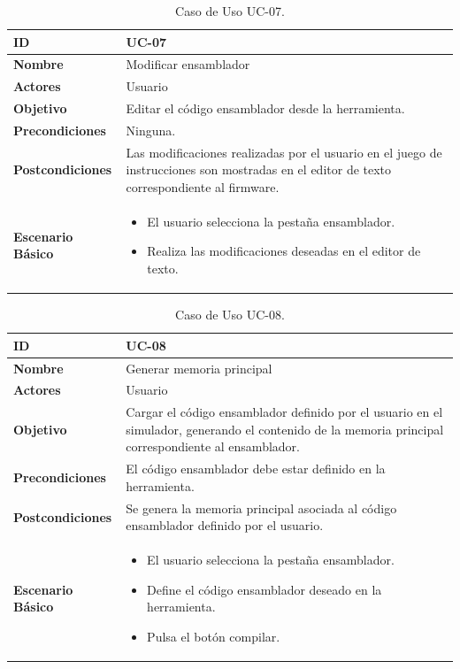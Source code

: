 \begin{center}
\begin{table}[htbp]
\centering
\begin{tabular}{@{}p{2.5cm} p{9cm}@{}} 
\toprule
\textbf{ID}	& UC-07  \\
\midrule
\textbf{Nombre} 		& Modificar ensamblador   \\
\midrule
\textbf{Actores} 		&	Usuario  \\
\midrule
\textbf{Objetivo} 	&	Editar el código ensamblador desde la herramienta. 	 \\
\midrule
\textbf{Precondiciones}	&	Ninguna.   \\
\midrule
\textbf{Postcondiciones} 	& Las modificaciones realizadas por el usuario en el juego de instrucciones son mostradas en el editor de texto correspondiente al firmware.   \\
\midrule
\textbf{Escenario Básico} 	&  \begin{itemize}
\item El usuario selecciona la pestaña ensamblador.
\item Realiza las modificaciones deseadas en el editor de texto.
\end{itemize} \\
\bottomrule
\end{tabular}
\caption{Caso de Uso UC-07.}
\label{tab:uc07}
\end{table}
\end{center}

\begin{center}
\begin{table}[htbp]
\centering
\begin{tabular}{@{}p{2.5cm} p{9cm}@{}} 
\toprule
\textbf{ID}	& UC-08  \\
\midrule
\textbf{Nombre} 		& Generar memoria principal   \\
\midrule
\textbf{Actores} 		&	Usuario  \\
\midrule
\textbf{Objetivo} 	&	Cargar el código ensamblador definido por el usuario en el simulador, generando el contenido de la memoria principal correspondiente al ensamblador. 	 \\
\midrule
\textbf{Precondiciones}	&	El código ensamblador debe estar definido en la herramienta.  \\
\midrule
\textbf{Postcondiciones} 	& Se genera la memoria principal asociada al código ensamblador definido por el usuario.   \\
\midrule
\textbf{Escenario Básico} 	&  \begin{itemize}
\item El usuario selecciona la pestaña ensamblador.
\item Define el código ensamblador deseado en la herramienta.
\item Pulsa el botón compilar.
\end{itemize} \\
\bottomrule
\end{tabular}
\caption{Caso de Uso UC-08.}
\label{tab:uc08}
\end{table}
\end{center}

